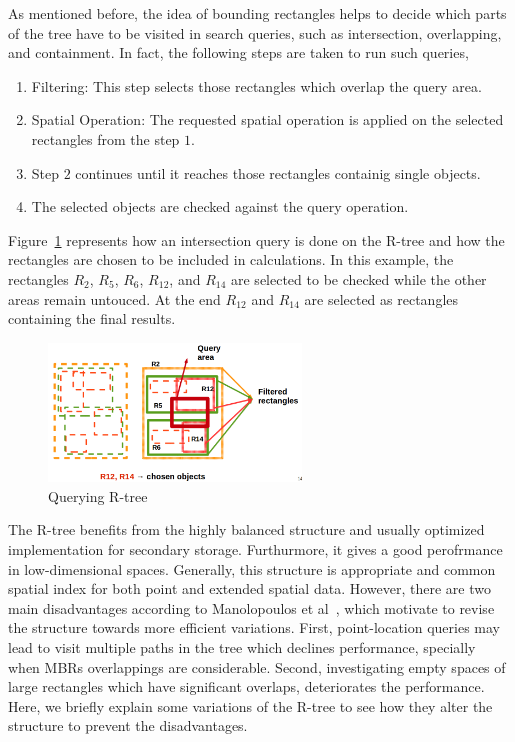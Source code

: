 \documentclass[a4paper,12pt]{article}
\begin{document}
As mentioned before, the idea of bounding rectangles helps to decide which parts of the tree have to be visited in search queries, such as intersection, overlapping, and containment. In fact, the following steps are taken to run such queries,
\begin{enumerate}
\item Filtering: This step selects those rectangles which overlap the query area.
\item Spatial Operation: The requested spatial operation is applied on the selected rectangles from the step $1$. 
\item Step $2$ continues until it reaches those rectangles containig single objects. 
\item The selected objects are checked against the query operation. 
\end{enumerate}
Figure~\ref{rtreequery} represents how an intersection query is done on the R-tree and how the rectangles are chosen to be included in calculations. In this example, the rectangles $R_2$, $R_5$, $R_6$, $R_{12}$, and $R_{14}$ are selected to be checked while the other areas remain untouced. At the end $R_{12}$ and $R_{14}$ are selected as rectangles containing the final results.

\begin{figure}
\centering
\includegraphics[width=0.6\textwidth,height=0.2\textheight]{Rtree-query}
\caption{Querying R-tree}
\label{rtreequery}
\end{figure}

The R-tree benefits from the highly balanced structure and usually optimized implementation for secondary storage. Furthurmore, it gives a good perofrmance in low-dimensional spaces. Generally, this structure is appropriate and common spatial index for both point and extended spatial data. However, there are two main disadvantages according to Manolopoulos et al~\cite{Manolopoulos:2005}, which motivate to revise the structure towards more efficient variations. First, point-location queries may lead to visit multiple paths in the tree which declines performance, specially when MBRs overlappings are considerable. Second, investigating empty spaces of large rectangles which have significant overlaps, deteriorates the performance. Here, we briefly explain some variations of the R-tree to see how they alter the structure to prevent the disadvantages.
\end{document}
